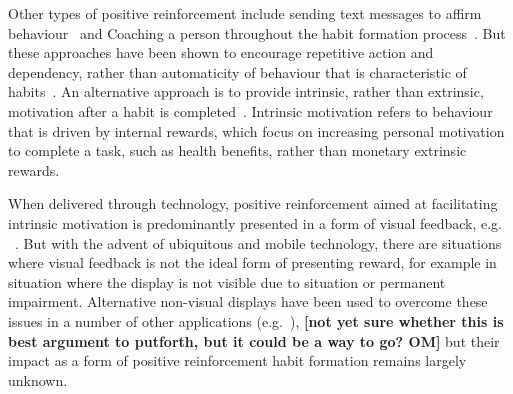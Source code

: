 \documentclass{scaffold/sigchi}
\begin{document}
%

Other types of positive reinforcement include sending text messages to affirm behaviour~\cite{chi_crowd_designed_motivation} and Coaching a person throughout the habit formation process~\cite{coaching_not_that_good}. But these approaches have been shown to encourage repetitive action and dependency, rather than automaticity of behaviour that is characteristic of habits~\cite{habits_as_automaticity_not_frequency_gardner}.
%
An alternative approach is to provide intrinsic, rather than extrinsic, motivation after a habit is completed~\cite{article_a_self_efficacy, article_meta_analytic_review_intrinsic_motivation}. Intrinsic motivation refers to behaviour that is driven by internal rewards, which focus on increasing personal motivation to complete a task, such as health benefits, rather than monetary extrinsic rewards.

When delivered through technology, positive reinforcement aimed at facilitating intrinsic motivation is predominantly presented in a form of visual feedback, e.g. %
~\cite{comparison_of_auditory_visual_feedback, visual_mode_better, article_realtime_feedback_improving_medication_taking}. 
%
But with the advent of ubiquitous and mobile technology, there are situations where visual feedback is not the ideal form of presenting reward, for example in situation where the display is not visible due to situation or permanent impairment. Alternative non-visual displays have been used to overcome these issues in a number of other applications (e.g.~\cite{burke2006comparing, vazquez2012auditory, chi_oussama_tap_the_shapetones}), 
\textbf{[not yet sure whether this is best argument to putforth, but it could be a way to go? OM]}
but their impact as a form of positive reinforcement habit formation remains largely unknown.


%
%
\end{document}
